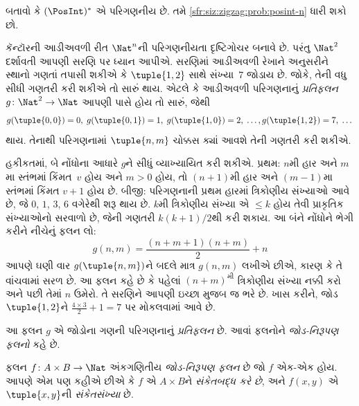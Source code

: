 \begin{prob}\label{sfr:siz:zigzag:prob:posint-star}
બતાવો કે $(\PosInt)^*$ એ પરિગણનીય છે.
તમે \cref{sfr:siz:zigzag:prob:posint-n} ધારી શકો છો.
\end{prob}
\endgroup


\begingroup
\makeatletter{}\makeatother

\label{guunit:OLP-0031}


\begin{explain}
કૅન્ટૉરની આડીઅવળી રીત $\Nat^n$ની પરિગણનીયતા દૃષ્ટિગોચર
બનાવે છે. પરંતુ $\Nat^2$ દર્શાવતી આપણી સરણિ પર
ધ્યાન આપીએ. સરણિમાં આડીઅવળી રેખાને અનુસરીને સ્થાનો
ગણતાં તપાસી શકીએ કે $\tuple{1,2}$ સાથે સંખ્યા~$7$
જોડાય છે. જોકે, તેની વધુ સીધી ગણતરી કરી શકીએ તો
સારું થાય. એટલે કે આડીઅવળી પરિગણનાનું
\emph{પ્રતિફલન} $g\colon \Nat^2 \to \Nat$
આપણી પાસે હોય તો સારું, જેથી
\[
g(\tuple{0,0}) = 0, \;
g(\tuple{0,1}) = 1, \;
g(\tuple{1,0}) = 2, \; \dots,
g(\tuple{1,2}) = 7, \; \dots
\]
થાય. તેનાથી પરિગણનામાં $\tuple{n, m}$ ચોક્કસ
ક્યાં આવશે તેની ગણતરી કરી શકીએ.

હકીકતમાં, બે નોંધોના આધારે $g$ને સીધું વ્યાખ્યાયિત
કરી શકીએ. પ્રથમ: $n$મી હાર અને $m$મા સ્તંભમાં
કિંમત~$v$ હોય અને $m>0$ હોય, તો $(n+1)$મી હાર અને $(m-1)$મા
સ્તંભમાં કિંમત $v + 1$ હોય છે. બીજી: પરિગણનાની
પ્રથમ હારમાં ત્રિકોણીય સંખ્યાઓ આવે છે, જે
$0$, $1$, $3$, $6$ વગેરેથી શરૂ થાય છે.
$k$મી ત્રિકોણીય સંખ્યા એ $\leq k$ હોય તેવી પ્રાકૃતિક
સંખ્યાઓનો સરવાળો છે, જેની ગણતરી $k(k+1)/2$થી
કરી શકાય.
આ બંને નોંધોને ભેગી કરીને નીચેનું ફલન લો:
\[
  g(n,m) = \frac{(n+m+1)(n+m)}{2} + n
\]
આપણે ઘણી વાર $g(\tuple{n, m})$ને બદલે માત્ર
$g(n, m)$ લખીએ છીએ, કારણ કે તે વાંચવામાં સરળ છે.
આ ફલન કહે છે કે પહેલાં $(n+m)^\text{મી}$
ત્રિકોણીય સંખ્યા નક્કી કરો અને પછી તેમાં $n$ ઉમેરો.
તે સરણિને આપણી ઇચ્છા મુજબ જ ભરે છે.
ખાસ કરીને, જોડ $\tuple{1, 2}$ને
$\frac{4 \times 3}{2} +
1 = 7$ પર મોકલવામાં આવે છે.

આ ફલન $g$ એ જોડોના ગણની પરિગણનાનું
\emph{પ્રતિફલન} છે. આવાં ફલનોને
\emph{જોડ-નિરૂપણ ફલનો} કહે છે.
\end{explain}

\begin{defn}[જોડ-નિરૂપણ ફલન]
ફલન $f\colon A \times B \to \Nat$ અંકગણિતીય
\emph{જોડ-નિરૂપણ ફલન} છે જો $f$ એક-એક હોય.
આપણે એમ પણ કહીએ છીએ કે $f$ એ $A \times B$ને
\emph{સંકેતબદ્ધ કરે છે}, અને $f(x,y)$ એ
$\tuple{x,y}$ની \emph{સંકેતસંખ્યા} છે.
\end{defn}

